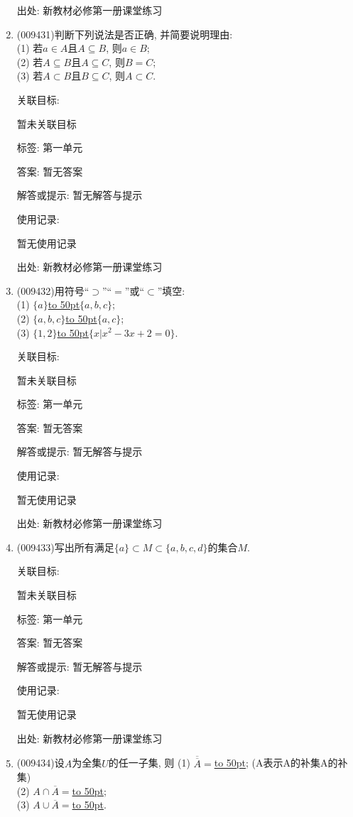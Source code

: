 \documentclass[10pt,a4paper]{article}
\newcommand{\blank}[1]{\underline{\hbox to #1pt{}}}
\begin{document}
\begin{enumerate}[1.]
出处: 新教材必修第一册课堂练习
\item { (009431)}判断下列说法是否正确, 并简要说明理由:\\
(1) 若$a\in A$且$A\subseteq B$, 则$a\in B$;\\
(2) 若$A\subseteq B$且$A\subseteq C$, 则$B=C$;\\
(3) 若$A\subset B$且$B\subseteq C$, 则$A\subset C$.


关联目标:

暂未关联目标



标签: 第一单元

答案: 暂无答案

解答或提示: 暂无解答与提示

使用记录:

暂无使用记录


出处: 新教材必修第一册课堂练习
\item { (009432)}用符号``$\supset$''``$=$''或``$\subset$''填空:\\
(1) $\{a\}$\blank{50}$\{a, b, c\}$;\\
(2) $\{a, b, c\}$\blank{50}$\{a, c\}$;\\
(3) $\{1, 2\}$\blank{50}$\{x|x^2-3x+2=0\}$.


关联目标:

暂未关联目标



标签: 第一单元

答案: 暂无答案

解答或提示: 暂无解答与提示

使用记录:

暂无使用记录


出处: 新教材必修第一册课堂练习
\item { (009433)}写出所有满足$\{a\}\subset M\subset \{a, b, c, d\}$的集合$M$.


关联目标:

暂未关联目标



标签: 第一单元

答案: 暂无答案

解答或提示: 暂无解答与提示

使用记录:

暂无使用记录


出处: 新教材必修第一册课堂练习
\item { (009434)}设$A$为全集$U$的任一子集, 则
(1) $\overline{\overline{A}}=$\blank{50}; (A表示A的补集A的补集)\\
(2) $A\cap \overline A=$\blank{50};\\
(3) $A\cup \overline A=$\blank{50}.



\end{enumerate}
\end{document}
